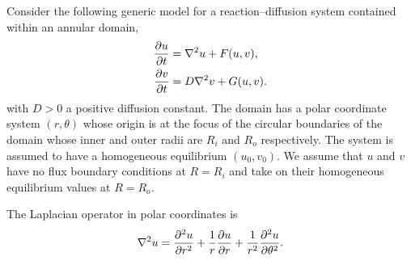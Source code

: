 \documentclass[a4paper, 12pt]{article}
\begin{document}
%

\begin{enumerate}[label={\bf \arabic{*}.\;}, ref={\arabic{*}},itemsep=3ex, left=0ex]

    {
      Consider the following generic model for a reaction--diffusion system contained within an annular domain,
      \begin{align*}
        \pd{u}{t} &= \nabla^2 u + F(u,v),\\
        \pd{v}{t} &= D\nabla^2 v + G(u,v).
      \end{align*}
      with $D>0$ a positive diffusion constant. The domain has a polar coordinate system $(r,\theta)$ whose origin is at the focus of the circular boundaries of the domain whose inner and outer radii are $R_i$ and $R_o$ respectively.  The system is assumed to have a homogeneous equilibrium $(u_0,v_0)$.  We assume that  $u$ and $v$ have no flux boundary conditions at $R=R_i$ and take on their homogeneous equilibrium values at $R = R_o$.

      The Laplacian operator in polar coordinates is
      \begin{equation}
        \nabla^2u = \pdd{u}{r} + \frac{1}{r}\pd{u}{r} + \frac{1}{r^2}\pdd{u}{\theta}.
      \end{equation}

}
\end{enumerate}
\end{document}
